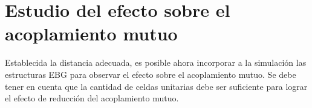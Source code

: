 \section{Estudio del efecto sobre el acoplamiento mutuo}
\label{sec_estudio_acoplam_mutuo}
Establecida la distancia adecuada, es posible ahora incorporar a la simulación las estructuras EBG para observar el efecto sobre el acoplamiento mutuo. Se debe tener en cuenta que la cantidad de celdas unitarias debe ser suficiente para lograr el efecto de reducción del acoplamiento mutuo.




